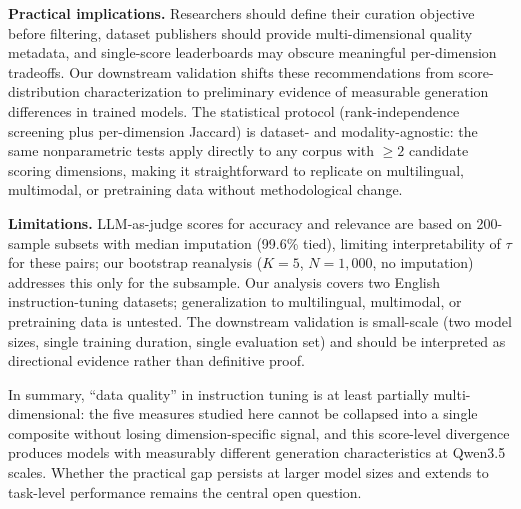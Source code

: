 \documentclass[11pt,a4paper]{article}
\begin{document}
\textbf{Practical implications.}
Researchers should define their curation objective before filtering, dataset publishers should provide multi-dimensional quality metadata, and single-score leaderboards may obscure meaningful per-dimension tradeoffs.
Our downstream validation shifts these recommendations from score-distribution characterization to preliminary evidence of measurable generation differences in trained models.
The statistical protocol (rank-independence screening plus per-dimension Jaccard) is dataset- and modality-agnostic: the same nonparametric tests apply directly to any corpus with $\geq 2$ candidate scoring dimensions, making it straightforward to replicate on multilingual, multimodal, or pretraining data without methodological change.

\textbf{Limitations.}
LLM-as-judge scores for accuracy and relevance are based on 200-sample subsets with median imputation (99.6\% tied), limiting interpretability of $\tau$ for these pairs; our bootstrap reanalysis ($K = 5$, $N = 1{,}000$, no imputation) addresses this only for the subsample.
Our analysis covers two English instruction-tuning datasets; generalization to multilingual, multimodal, or pretraining data is untested.
The downstream validation is small-scale (two model sizes, single training duration, single evaluation set) and should be interpreted as directional evidence rather than definitive proof.

In summary, ``data quality'' in instruction tuning is at least partially multi-dimensional: the five measures studied here cannot be collapsed into a single composite without losing dimension-specific signal, and this score-level divergence produces models with measurably different generation characteristics at Qwen3.5 scales.
Whether the practical gap persists at larger model sizes and extends to task-level performance remains the central open question.



\end{document}
